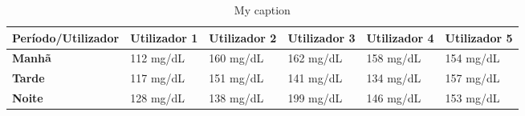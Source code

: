 \begin{table}[h]
\begin{adjustbox}{max width=\textwidth}
\centering

\label{my-label}
\begin{tabular}{|l|l|l|l|l|l|}
\hline
\rowcolor[HTML]{C0C0C0} 
{\color[HTML]{000000} \textbf{Período/Utilizador}} & {\color[HTML]{000000} \textbf{Utilizador 1}} & {\color[HTML]{000000} \textbf{Utilizador 2}} & {\color[HTML]{000000} \textbf{Utilizador 3}} & {\color[HTML]{000000} \textbf{Utilizador 4}} & {\color[HTML]{000000} \textbf{Utilizador 5}} \\ \hline
\cellcolor[HTML]{C0C0C0}\textbf{Manhã}             & 112 mg/dL                                    & 160 mg/dL                                    & 162 mg/dL                                    & 158 mg/dL                                    & 154 mg/dL                                    \\ \hline
\cellcolor[HTML]{C0C0C0}\textbf{Tarde}             & 117 mg/dL                                    & 151 mg/dL                                    & 141 mg/dL                                    & 134 mg/dL                                    & 157 mg/dL                                    \\ \hline
\cellcolor[HTML]{C0C0C0}\textbf{Noite}             & 128 mg/dL                                    & 138 mg/dL                                    & 199 mg/dL                                    & 146 mg/dL                                    & 153 mg/dL                                    \\ \hline
\end{tabular}
\end{adjustbox}
\caption{My caption}
\end{table}


